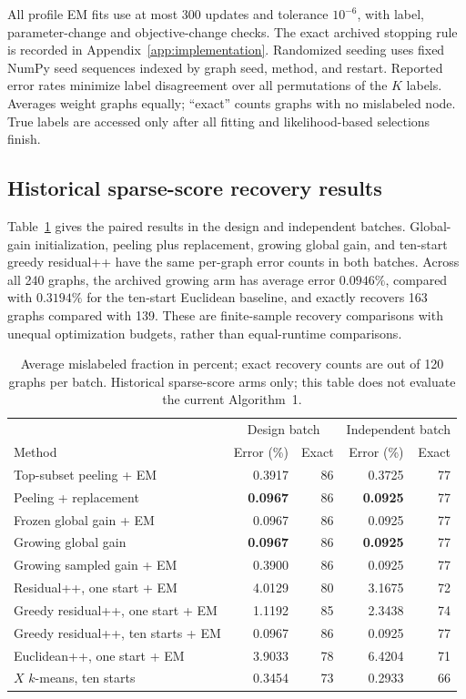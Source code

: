 \documentclass[11pt]{article}
\theoremstyle{definition}
\theoremstyle{remark}
\numberwithin{equation}{section}
\begin{document}
All profile EM fits use at most 300 updates and tolerance $10^{-6}$, with label, parameter-change and objective-change checks. The exact archived stopping rule is recorded in Appendix~\ref{app:implementation}.
Randomized seeding uses fixed NumPy seed sequences indexed by graph seed,
method, and restart. Reported error rates minimize label disagreement over
all permutations of the $K$ labels. Averages weight graphs equally; ``exact''
counts graphs with no mislabeled node. True labels are accessed only after
all fitting and likelihood-based selections finish.

\subsection{Historical sparse-score recovery results}

Table~\ref{tab:experiment_summary} gives the paired results in the design and
independent batches. Global-gain initialization, peeling plus replacement,
growing global gain, and ten-start greedy residual++ have the same per-graph
error counts in both batches. Across all 240 graphs, the archived growing
arm has average error $0.0946\%$, compared with $0.3194\%$ for the ten-start
Euclidean baseline, and exactly recovers 163 graphs compared with 139.
These are finite-sample recovery comparisons with unequal optimization
budgets, rather than equal-runtime comparisons.

\begin{table}[tb]
\centering
\small
\caption{Average mislabeled fraction in percent; exact recovery counts are
out of 120 graphs per batch. Historical sparse-score arms only; this table does not evaluate the current Algorithm~1.}
\label{tab:experiment_summary}
\begin{tabular}{lrrrr}
\toprule
&\multicolumn{2}{c}{Design batch}&\multicolumn{2}{c}{Independent batch}\\
Method&Error (\%)&Exact&Error (\%)&Exact\\
\midrule
Top-subset peeling + EM&0.3917&86&0.3725&77\\
Peeling + replacement&\textbf{0.0967}&86&\textbf{0.0925}&77\\
Frozen global gain + EM&0.0967&86&0.0925&77\\
Growing global gain&\textbf{0.0967}&86&\textbf{0.0925}&77\\
Growing sampled gain + EM&0.3900&86&0.0925&77\\
Residual++, one start + EM&4.0129&80&3.1675&72\\
Greedy residual++, one start + EM&1.1192&85&2.3438&74\\
Greedy residual++, ten starts + EM&0.0967&86&0.0925&77\\
Euclidean++, one start + EM&3.9033&78&6.4204&71\\
$X$ $k$-means, ten starts&0.3454&73&0.2933&66\\
\bottomrule
\end{tabular}
\end{table}
\end{document}
